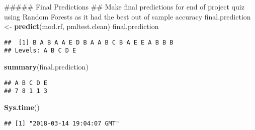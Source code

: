 \documentclass[]{article}
\newenvironment{Shaded}{\begin{snugshade}}{\end{snugshade}}
\newcommand{\KeywordTok}[1]{\textcolor[rgb]{0.13,0.29,0.53}{\textbf{{#1}}}}
\newcommand{\StringTok}[1]{\textcolor[rgb]{0.31,0.60,0.02}{{#1}}}
\newcommand{\NormalTok}[1]{{#1}}
\begin{document}
\begin{Shaded}
\begin{Highlighting}[]
\NormalTok{##### Final Predictions}
\NormalTok{## Make final predictions for end of project quiz using Random Forests as it had the best out of sample accuracy}
\NormalTok{final.prediction <-}\StringTok{ }\KeywordTok{predict}\NormalTok{(mod.rf, pmltest.clean)}
\NormalTok{final.prediction}
\end{Highlighting}
\end{Shaded}

\begin{verbatim}
##  [1] B A B A A E D B A A B C B A E E A B B B
## Levels: A B C D E
\end{verbatim}

\begin{Shaded}
\begin{Highlighting}[]
\KeywordTok{summary}\NormalTok{(final.prediction)}
\end{Highlighting}
\end{Shaded}

\begin{verbatim}
## A B C D E 
## 7 8 1 1 3
\end{verbatim}

\begin{Shaded}
\begin{Highlighting}[]
\KeywordTok{Sys.time}\NormalTok{()}
\end{Highlighting}
\end{Shaded}

\begin{verbatim}
## [1] "2018-03-14 19:04:07 GMT"
\end{verbatim}
\end{document}
